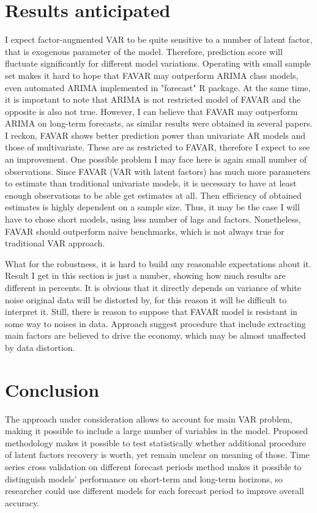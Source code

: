 \documentclass[a4paper, 14pt]{article}
\begin{document}
\section*{Results anticipated}

I expect factor-augmented VAR to be quite sensitive to a number of latent factor, that is exogenous parameter of the model. Therefore, prediction score will fluctuate significantly for different model variations. Operating with small sample set makes it hard to hope that FAVAR may outperform ARIMA class models, even automated ARIMA implemented in "forecast" R package. At the same time, it is important to note that ARIMA is not restricted model of FAVAR and the opposite is also not true. However, I can believe that FAVAR may outperform ARIMA on long-term forecasts, as similar results were obtained in several papers. I reckon, FAVAR shows better prediction power than univariate AR models and those of multivariate. These are as restricted to FAVAR, therefore I expect to see an improvement. One possible problem I may face here is again small number of observations. Since FAVAR (VAR with latent factors) has much more parameters to estimate than traditional univariate models, it is necessary to have at least enough observations to be able get estimates at all. Then efficiency of obtained estimates is highly dependent on a sample size. Thus, it may be the case I will have to chose short models, using less number of lags and factors. Nonetheless, FAVAR should outperform naive benchmarks, which is not always true for traditional VAR approach.

What for the robustness, it is hard to build any reasonable expectations about it. Result I get in this section is just a number, showing how much results are different in percents. It is obvious that it directly depends on variance of white noise original data will be distorted by, for this reason it will be difficult to interpret it. Still, there is reason to suppose that FAVAR model is resistant in some way to noises in data. Approach suggest procedure that include extracting main factors are believed to drive the economy, which may be almost unaffected by data distortion. 

\section*{Conclusion}
The approach under consideration allows to account for main VAR problem, making it possible to include a large number of variables in the model. Proposed methodology makes it possible to test statistically whether additional procedure of latent factors recovery is worth, yet remain unclear on meaning of those. Time series cross validation on different forecast periods method makes it possible to distinguish models' performance on short-term and long-term horizons, so researcher could use different models for each forecast period to improve overall accuracy. 
\end{document}
